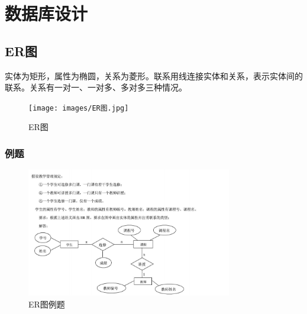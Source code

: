 \section{数据库设计}
\subsection{ER图}
实体为矩形，属性为椭圆，关系为菱形。联系用线连接实体和关系，表示实体间的联系。关系有一对一、一对多、多对多三种情况。
\begin{figure}[H]
\centering
\texttt{[image: images/ER图.jpg]}
\caption{ER图}
\end{figure}
\subsubsection{例题}
\begin{figure}[H]
\centering
\includegraphics[width=0.8\textwidth]{images/ER图例题.png}
\caption{ER图例题}
\end{figure}

